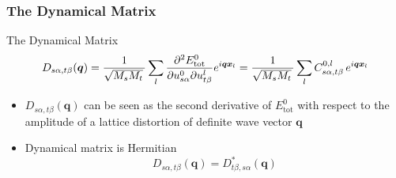 \begin{frame}
  \frametitle{The Dynamical Matrix}
  The Dynamical Matrix
  \begin{equation*}
    \mathcolor{black}{
      D_{s\alpha,t\beta}(\boldsymbol{q})
    }
    =
    {1\over\sqrt{M_sM_t}\,}
    \mathcolor{black}{\sum_l}
    \mathcolor{black}{
      \frac{
      \partial^2 E^0_{\text{tot}}
      }{
      \partial {u}_{s\alpha}^0
      \partial {u}_{t\beta}^l
      }
      e^{i\boldsymbol{q}\boldsymbol{x}_l}
    }
    =
    {1\over\sqrt{M_sM_t}\,}
    \sum_l
    C_{s\alpha,t\beta}^{0, l}\,
    e^{i\boldsymbol{q}\boldsymbol{x}_l}
  \end{equation*}

  \begin{itemize}
  \item $D_{s\alpha,t\beta}(\boldsymbol{q})$ can be seen as the second
    derivative of $E^0_{\text{tot}}$ with respect to the amplitude of a lattice
    distortion of definite wave vector $\boldsymbol{q}$
      
  \item Dynamical matrix is Hermitian
    \begin{equation*}
      D_{s\alpha,t\beta}(\boldsymbol{q})
      =
      D^*_{t\beta,s\alpha}(\boldsymbol{q})
    \end{equation*}
    

\end{itemize}
\end{frame}
